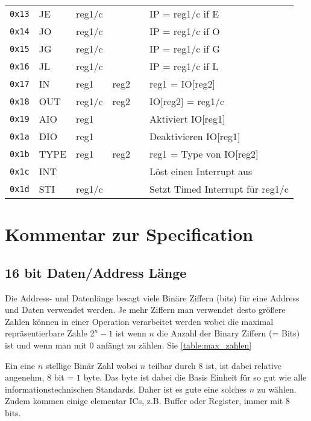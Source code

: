 \documentclass{scrartcl}
\begin{document}
\begin{center}
\begin{table*}
\begin{tabular}{l | l l l l | l}
			\texttt{0x13} & JE   & reg1/c &  &  & IP = reg1/c if E \\
			\texttt{0x14} & JO   & reg1/c &  &  & IP = reg1/c if O \\
			\texttt{0x15} & JG   & reg1/c &  &  & IP = reg1/c if G \\
			\texttt{0x16} & JL   & reg1/c &  &  & IP = reg1/c if L \\
			\hline
			\texttt{0x17} & IN   & reg1 & reg2 &  & reg1 = IO[reg2] \\
			\texttt{0x18} & OUT  & reg1/c & reg2 &  & IO[reg2] = reg1/c \\
			\texttt{0x19} & AIO  & reg1 &  &  & Aktiviert IO[reg1] \\
			\texttt{0x1a} & DIO  & reg1 &  &  & Deaktivieren IO[reg1] \\
			\texttt{0x1b} & TYPE & reg1 & reg2 &  & reg1 = Type von IO[reg2] \\
			\hline
			\texttt{0x1c} & INT  & & & & Löst einen Interrupt aus \\
			\texttt{0x1d} & STI  & reg1/c & & & Setzt Timed Interrupt für reg1/c \\
			\hline
		\end{tabular}
	\end{table*}
\end{center}

\section{Kommentar zur Specification}

\subsection{\label{section:comment:datalength}16 bit Daten/Address Länge}

Die Address- und Datenlänge besagt viele Binäre Ziffern (bits) für eine Address und Daten verwendet werden. Je mehr Ziffern man verwendet desto größere Zahlen können in einer Operation verarbeitet werden wobei die maximal repräsentierbare Zahle $2^n - 1$ ist wenn $n$ die Anzahl der Binary Ziffern (= Bits) ist und wenn man mit $0$ anfängt zu zählen. Sie \autoref{table:max_zahlen}

Ein eine $n$ stellige Binär Zahl wobei $n$ teilbar durch $8$ ist, ist dabei relative angenehm, $8$ bit = $1$ byte. Das byte ist dabei die Basis Einheit für so gut wie alle informationstechnischen Standards. Daher ist es gute eine solches $n$ zu wählen.
Zudem kommen einige elementar ICs, z.B. Buffer oder Register, immer mit 8 bits.
\end{document}
